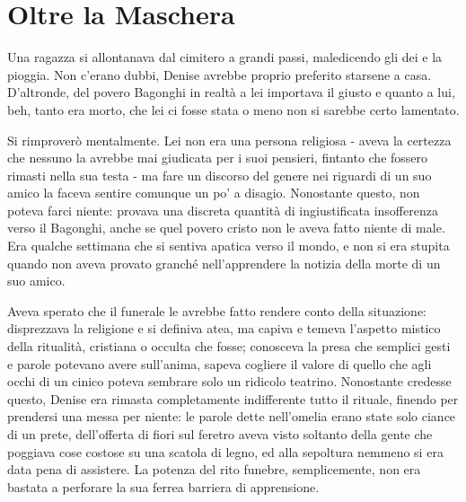 \chapter{Oltre la Maschera}


Una ragazza si allontanava dal cimitero a grandi passi, maledicendo gli dei e la pioggia. Non c'erano dubbi, Denise avrebbe proprio preferito starsene a casa. D'altronde, del povero Bagonghi in realtà a lei importava il giusto e quanto a lui, beh, tanto era morto, che lei ci fosse stata o meno non si sarebbe certo lamentato.

Si rimproverò mentalmente. Lei non era una persona religiosa - aveva la certezza che nessuno la avrebbe mai giudicata per i suoi pensieri, fintanto che fossero rimasti nella sua testa - ma fare un discorso del genere nei riguardi di un suo amico la faceva sentire comunque un po' a disagio. Nonostante questo, non poteva farci niente: provava una discreta quantità di ingiustificata insofferenza verso il Bagonghi, anche se quel povero cristo non le aveva fatto niente di male. Era qualche settimana che si sentiva apatica verso il mondo, e non si era stupita quando non aveva provato granché nell'apprendere la notizia della morte di un suo amico.

Aveva sperato che il funerale le avrebbe fatto rendere conto della situazione: disprezzava la religione e si definiva atea, ma capiva e temeva l'aspetto mistico della ritualità, cristiana o occulta che fosse; conosceva la presa che semplici gesti e parole potevano avere sull'anima, sapeva cogliere il valore di quello che agli occhi di un cinico poteva sembrare solo un ridicolo teatrino. Nonostante credesse questo, Denise era rimasta completamente indifferente tutto il rituale, finendo per prendersi una messa per niente: le parole dette nell'omelia erano state solo ciance di un prete, dell'offerta di fiori sul feretro aveva visto soltanto della gente che poggiava cose costose su una scatola di legno, ed alla sepoltura nemmeno si era data pena di assistere. La potenza del rito funebre, semplicemente, non era bastata a perforare la sua ferrea barriera di apprensione.

